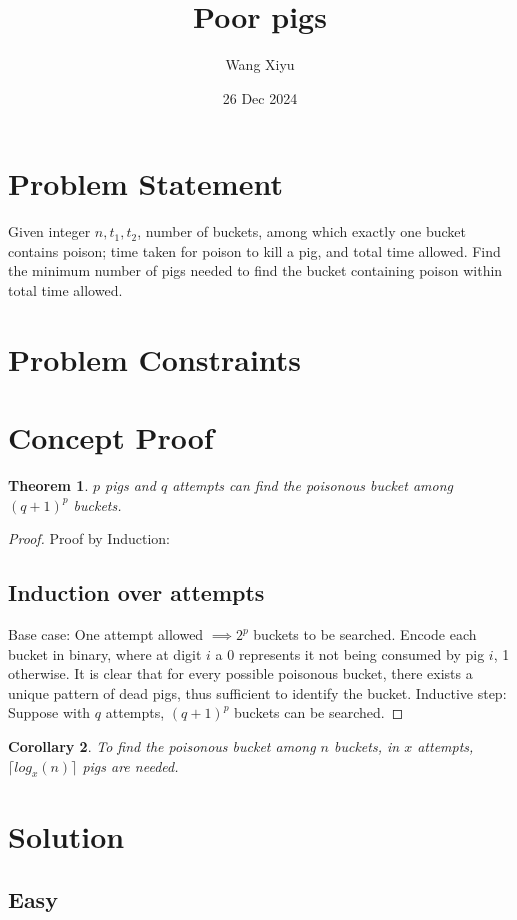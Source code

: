\documentclass{article}
\newtheorem{theorem}{Theorem}[section]
\newtheorem{corollary}[theorem]{Corollary}
\begin{document}
\title{Poor pigs}
\author{Wang Xiyu}
\date{26 Dec 2024}
\maketitle

\section*{Problem Statement}
Given integer $n, t_1, t_2$, number of buckets, among which exactly one bucket contains poison; 
time taken for poison to kill a pig, and total time allowed. Find the minimum number of pigs needed to
find the bucket containing poison within total time allowed.
\section*{Problem Constraints}
\section*{Concept Proof}
\begin{theorem}
    $p$ pigs and $q$ attempts can find the poisonous bucket among $(q+1)^p$ buckets.
\end{theorem}
\begin{proof}
    Proof by Induction: 
    \subsection*{Induction over attempts} 
    Base case: One attempt allowed $\implies 2^p$ buckets to be searched. Encode each bucket in binary,
    where at digit $i$ a 0 represents it not being consumed by pig $i$, 1 otherwise. It is clear that for every possible 
    poisonous bucket, there exists a unique pattern of dead pigs, thus sufficient to identify the bucket. 
    \newline
    Inductive step: Suppose with $q$ attempts, $(q+1)^p$ buckets can be searched. 
\end{proof}
\begin{corollary}
    To find the poisonous bucket among $n$ buckets, in $x$ attempts, $\lceil log_x(n) \rceil$ pigs are needed.
\end{corollary}
\section*{Solution}
\subsection*{Easy}
\end{document}
